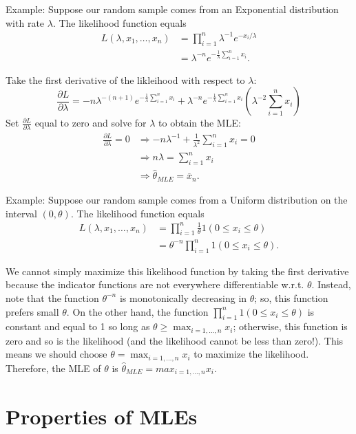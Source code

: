 \documentclass[
]{book}
\begin{document}
Example: Suppose our random sample comes from an Exponential distribution with rate \(\lambda\). The likelihood function equals
\begin{align*}
L(\lambda, x_1, \ldots, x_n) &= \prod_{i=1}^n \lambda^{-1}e^{-x_i/\lambda}\\
& = \lambda ^{-n}e^{-\tfrac1\lambda\sum_{i=1}^n x_i}.
\end{align*}

Take the first derivative of the likleihood with respect to \(\lambda\):
\[\frac{\partial L}{\partial \lambda} = -n\lambda^{-(n+1)}e^{-\tfrac1\lambda \sum_{i=1}^n x_i} + \lambda^{-n}e^{-\tfrac1\lambda\sum_{i=1}^n x_i}\left(\lambda^{-2}\sum_{i=1}^n x_i\right)\]
Set \(\tfrac{\partial L}{\partial \lambda}\) equal to zero and solve for \(\lambda\) to obtain the MLE:
\begin{align*}
\frac{\partial L}{\partial \lambda} = 0 & \Rightarrow -n\lambda^{-1} + \tfrac{1}{\lambda^2}\sum_{i=1}^n x_i = 0\\
& \Rightarrow n\lambda = \sum_{i=1}^n x_i\\
& \Rightarrow \hat{\theta}_{MLE} = \overline x_n.
\end{align*}

Example: Suppose our random sample comes from a Uniform distribution on the interval \((0,\theta)\). The likelihood function equals
\begin{align*}
L(\lambda, x_1, \ldots, x_n) &= \prod_{i=1}^n \frac{1}{\theta}1(0\leq x_i\leq \theta) \\
& = \theta^{-n}\prod_{i=1}^n 1(0\leq x_i\leq \theta).
\end{align*}

We cannot simply maximize this likelihood function by taking the first derivative because the indicator functions are not everywhere differentiable w.r.t. \(\theta\). Instead, note that the function \(\theta^{-n}\) is monotonically decreasing in \(\theta\); so, this function prefers small \(\theta\). On the other hand, the function \(\prod_{i=1}^n 1(0\leq x_i\leq \theta)\) is constant and equal to 1 so long as \(\theta \geq \max_{i=1, \ldots, n} x_i\); otherwise, this function is zero and so is the likelihood (and the likelihood cannot be less than zero!). This means we should choose \(\theta = \max_{i=1, \ldots, n} x_i\) to maximize the likelihood. Therefore, the MLE of \(\theta\) is \(\hat\theta_{MLE} = max_{i=1, \ldots, n} x_i\).

\hypertarget{properties-of-mles}{%
\section{Properties of MLEs}\label{properties-of-mles}}
\end{document}
